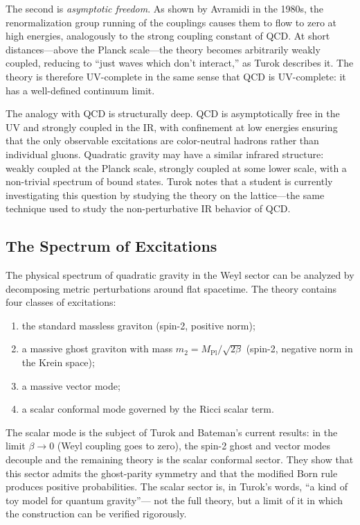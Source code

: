 \documentclass[12pt,a4paper]{article}
\theoremstyle{remark}
\begin{document}
The second is \emph{asymptotic freedom}. As shown by Avramidi in the
1980s, the renormalization group running of the couplings causes them to
flow to zero at high energies, analogously to the strong coupling constant
of QCD. At short distances---above the Planck scale---the theory becomes
arbitrarily weakly coupled, reducing to ``just waves which don't interact,''
as Turok describes it. The theory is therefore UV-complete in the same
sense that QCD is UV-complete: it has a well-defined continuum limit.

The analogy with QCD is structurally deep. QCD is asymptotically free in
the UV and strongly coupled in the IR, with confinement at low energies
ensuring that the only observable excitations are color-neutral hadrons
rather than individual gluons. Quadratic gravity may have a similar infrared
structure: weakly coupled at the Planck scale, strongly coupled at some
lower scale, with a non-trivial spectrum of bound states. Turok notes that
a student is currently investigating this question by studying the theory
on the lattice---the same technique used to study the non-perturbative
IR behavior of QCD.

\subsection{The Spectrum of Excitations}

The physical spectrum of quadratic gravity in the Weyl sector can be
analyzed by decomposing metric perturbations around flat spacetime.
The theory contains four classes of excitations:
\begin{enumerate}[label=(\roman*)]
  \item the standard massless graviton (spin-2, positive norm);
  \item a massive ghost graviton with mass $m_2 = M_{\mathrm{Pl}}/\sqrt{2\beta}$
        (spin-2, negative norm in the Krein space);
  \item a massive vector mode;
  \item a scalar conformal mode governed by the Ricci scalar term.
\end{enumerate}
The scalar mode is the subject of Turok and Bateman's current results: in
the limit $\beta \to 0$ (Weyl coupling goes to zero), the spin-2 ghost
and vector modes decouple and the remaining theory is the scalar conformal
sector. They show that this sector admits the ghost-parity symmetry and
that the modified Born rule produces positive probabilities. The scalar
sector is, in Turok's words, ``a kind of toy model for quantum gravity''---
not the full theory, but a limit of it in which the construction can be
verified rigorously.
\end{document}
